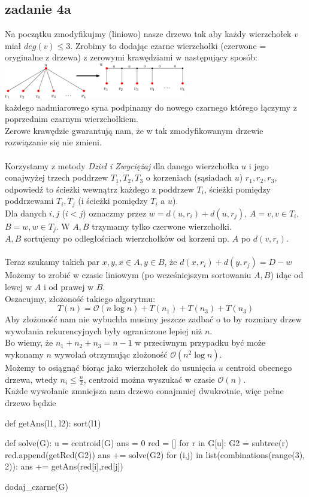 \documentclass{article}
\begin{document}
\subsection*{zadanie 4a}
Na początku zmodyfikujmy (liniowo) nasze drzewo tak aby każdy wierzchołek $v$ miał $deg(v) \leq 3$. Zrobimy to dodając czarne wierzchołki (czerwone = oryginalne z drzewa) z zerowymi krawędziami w następujący sposób:\\
\includegraphics[scale=1.2]{czarne}\\
każdego nadmiarowego syna podpinamy do nowego czarnego którego łączymy z poprzednim czarnym wierzchołkiem.\\
Zerowe krawędzie gwarantują nam, że w tak zmodyfikowanym drzewie rozwiązanie się nie zmieni.\\\\
Korzystamy z metody \textit{Dziel i Zwyciężaj} dla danego wierzchołka $u$ i jego conajwyżej trzech poddrzew $T_1,T_2,T_3$ o korzeniach (sąsiadach $u$) $r_1,r_2,r_3$, odpowiedź to ścieżki wewnątrz każdego z poddrzew $T_i$, ścieżki pomiędzy poddrzewami $T_i, T_j$ (i ścieżki pomiędzy $T_i$ a $u$).\\
Dla danych $i,j$ ($i<j$) oznaczmy przez $w = d(u,r_i) + d(u,r_j)$, $A = v, v \in {T_i}$, $B = w, w \in T_j$. W $A,B$ trzymamy tylko czerwone wierzchołki.\\$A,B$ sortujemy po odległościach wierzchołków od korzeni np. $A$ po $d(v,r_i)$.\\\\
Teraz szukamy takich par $x,y, x\in A, y \in B$, że $d(x,r_i) + d(y,r_j) = D - w$\\
Możemy to zrobić w czasie liniowym (po wcześniejszym sortowaniu $A,B$) idąc od lewej w $A$ i od prawej w $B$.\\
Oszacujmy, złożoność takiego algorytmu:
$$
T(n) = \mathcal{O}(n\log{n}) + T(n_1) + T(n_3) + T(n_3)
$$
Aby złożoność nam nie wybuchła musimy jeszcze zadbać o to by rozmiary drzew wywołania rekurencyjnych były ograniczone lepiej niż $n$. \\Bo wiemy, że $n_1 + n_2 + n_3 = n-1$ w przeciwnym przypadku być może wykonamy $n$ wywołań otrzymując złożoność $\mathcal{O}(n^2\log{n})$.\\
Możemy to osiągnąć biorąc jako wierzchołek do usunięcia $u$ centroid obecnego drzewa, wtedy $n_i \leq \frac{n}{2}$, centroid można wyszukać w czasie $\mathcal{O}(n)$.\\
Każde wywołanie zmniejsza nam drzewo conajmniej dwukrotnie, więc pełne drzewo będzie \\
\clearpage
\begin{python}
def getAns(l1, l2):
    sort(l1)

def solve(G):
    u = centroid(G)
    ans = 0
    red = []
    for r in G[u]:
        G2 = subtree(r)
        red.append(getRed(G2))
        ans += solve(G2)
    for (i,j) in list(combinations(range(3), 2)):
        ans += getAns(red[i],red[j])

dodaj_czarne(G)
\end{python}

\clearpage
\end{document}
